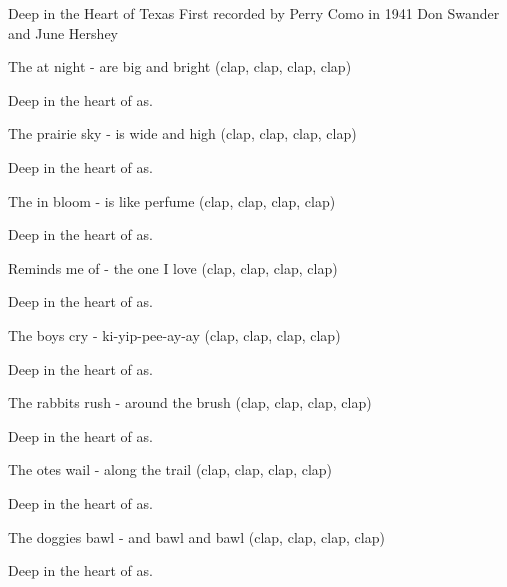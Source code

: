 \begin{SBSong}{Deep in the Heart of Texas}
  {First recorded by Perry Como in 1941}
  {Don Swander and June Hershey}
  \begin{SBVerse}
    The  at night - are big and bright (clap, clap, clap, clap)
    
    Deep in the heart of as. 
            
    The prairie sky - is wide and high (clap, clap, clap, clap)
    
    Deep in the heart of as.
  \end{SBVerse}
  \begin{SBVerse}
    The  in bloom - is like perfume (clap, clap, clap, clap)
    
    Deep in the heart of as. 
    
    Reminds me of - the one I love (clap, clap, clap, clap)
    
    Deep in the heart of as. 
  \end{SBVerse}
  \begin{SBVerse}
    The boys cry - ki-yip-pee-ay-ay (clap, clap, clap, clap)
    
    Deep in the heart of as.

    The rabbits rush - around the brush (clap, clap, clap, clap)
    
    Deep in the heart of as.
  \end{SBVerse}
  \begin{SBVerse}
    The otes wail - along the trail (clap, clap, clap, clap)
    
    Deep in the heart of as.
    
    The doggies bawl - and bawl and bawl (clap, clap, clap, clap)
    
    Deep in the heart of as. 
  \end{SBVerse}
%    
%    
%    
\end{SBSong}

